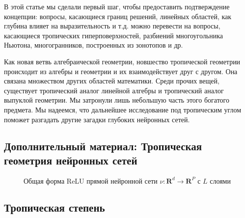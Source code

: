 \documentclass[russian]{lecture-notes}
\begin{document}
	В этой статье мы сделали первый шаг, чтобы предоставить подтверждение концепции: вопросы, касающиеся границ решений, линейных областей, как глубина влияет на выразительность и т.д. можно перевести на вопросы, касающиеся тропических гиперповерхностей, разбиений многоугольника Ньютона, многогранников, построенных из зонотопов и др.
	
	Как новая ветвь алгебраической геометрии, новшество тропической геометрии происходит из алгебры и геометрии и их взаимодействует друг с другом. Она связана множеством других областей математики. Среди прочих вещей, существует тропический аналог линейной алгебры и тропический аналог выпуклой геометрии. Мы затронули лишь небольшую часть этого богатого предмета. Мы надеемся, что дальнейшее исследование под тропическим углом поможет разгадать другие загадки глубоких нейронных сетей.
	\subsection{Дополнительный материал: Тропическая геометрия нейронных сетей}
	\begin{figure}[h]
		\caption{Общая форма ReLU прямой нейронной сети $\nu:\mathbf{R}^d \rightarrow \mathbf{R}^P$ с $L$ слоями}
	\end{figure}

	\newpage
	\subsection{Тропическая степень}
	
\end{document}
